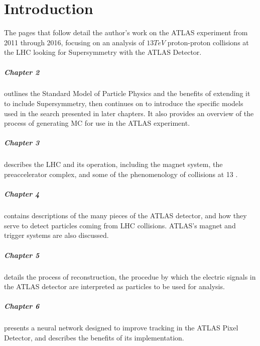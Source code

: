 
\chapter{Introduction} %

\label{ch:introduction} %

The pages that follow detail the author's work on the ATLAS experiment from 2011 through 2016, focusing on an analysis of $13 TeV$ proton-proton collisions at the \ac{LHC} looking for Supersymmetry with the ATLAS Detector. 

\paragraph{Chapter 2} outlines the Standard Model of Particle Physics and the benefits of extending it to include Supersymmetry, then continues on to introduce the specific models used in the search presented in later chapters. It also provides an overview of the process of generating \ac{MC} for use in the ATLAS experiment.

\paragraph{Chapter 3} describes the \ac{LHC} and its operation, including the magnet system, the preaccelerator complex, and some of the phenomenology of collisions at 13 \tev.

\paragraph{Chapter 4} contains descriptions of the many pieces of the ATLAS detector, and how they serve to detect particles coming from \ac{LHC} collisions. ATLAS's magnet and trigger systems are also discussed.

\paragraph{Chapter 5} details the process of reconstruction, the procedue by which the electric signals in the ATLAS detector are interpreted as particles to be used for analysis. 

\paragraph{Chapter 6} presents a neural network designed to improve tracking in the ATLAS Pixel Detector, and describes the benefits of its implementation. 

